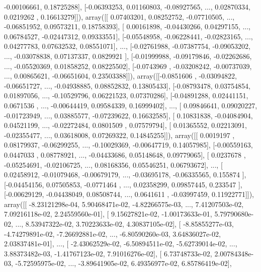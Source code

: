 \documentclass{article}
\begin{document}
        -0.00106661,  0.18725288],
       [-0.06393253,  0.01160803, -0.08927565, ...,  0.02870334,
         0.0219262 ,  0.16613279]]), array([[ 0.07403201,  0.08252752, -0.07710505, ..., -0.06851952,
         0.09573211,  0.18758393],
       [ 0.00161898, -0.04430266,  0.04297155, ...,  0.06784527,
        -0.02447312,  0.09333551],
       [-0.05548958, -0.06228441, -0.02823165, ...,  0.04277783,
         0.07632532,  0.08551071],
       ..., 
       [-0.02761988, -0.07387754, -0.09053202, ..., -0.03078838,
         0.07137337,  0.0829921 ],
       [-0.01999988, -0.09179846, -0.02262686, ..., -0.05520369,
         0.01858252,  0.08225502],
       [-0.0743969 , -0.03208242, -0.00737039, ...,  0.00865621,
        -0.06651604,  0.23503388]]), array([[-0.0851606 , -0.03094822, -0.06651727, ..., -0.04938885,
         0.08852832,  0.13805433],
       [-0.08793478,  0.03754854,  0.01897056, ..., -0.10529796,
         0.06221523,  0.07370286],
       [-0.04891288,  0.02441151,  0.0671536 , ..., -0.00644419,
         0.09584339,  0.16999402],
       ..., 
       [ 0.09846641,  0.09020227, -0.01723949, ...,  0.03885577,
        -0.07239622,  0.16632585],
       [ 0.10831838, -0.04084904,  0.04521199, ..., -0.02272484,
         0.0801509 ,  0.07579794],
       [ 0.01365552,  0.02213091, -0.02355477, ...,  0.03618008,
         0.07269322,  0.14845255]]), array([[ 0.0019197 ,  0.08179937, -0.06299255, ..., -0.10029369,
        -0.00647719,  0.14057985],
       [-0.00559163,  0.0447033 ,  0.08778921, ..., -0.04433686,
         0.05148648,  0.09779065],
       [ 0.0237678 , -0.05254691, -0.02106725, ...,  0.08168356,
         0.05546251,  0.06793672],
       ..., 
       [ 0.02458912, -0.01079468, -0.00679179, ..., -0.03695178,
        -0.06335565,  0.155874  ],
       [-0.04454156,  0.07505853, -0.0771464 , ...,  0.02358299,
         0.09857445,  0.233547  ],
       [-0.00629129, -0.04438049,  0.08508744, ...,  0.0641611 ,
        -0.03997459,  0.11922771]]), array([[ -8.23121298e-04,   5.90468471e-02,  -4.82266575e-03, ...,
          7.41207503e-02,   7.09216118e-02,   2.24559560e-01],
       [  9.15627821e-02,  -1.00173633e-01,   5.79790680e-02, ...,
          8.53947322e-02,   3.70223633e-02,   4.30837105e-02],
       [ -8.85855277e-03,  -4.74279891e-02,  -7.26692881e-02, ...,
         -6.80590260e-03,   3.64836027e-02,   2.03837481e-01],
       ..., 
       [ -2.43062529e-02,  -6.50894511e-02,  -5.62739014e-02, ...,
          3.88373482e-03,  -1.41767123e-02,   7.91016276e-02],
       [  6.73748733e-02,   2.00784348e-03,  -5.72595975e-02, ...,
         -3.89641905e-02,   6.49356977e-02,   6.85786419e-02],
\end{document}
